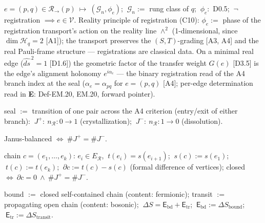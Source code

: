 \begin{definition}[{\texorpdfstring{D1.1}{D1.1}}]\label{tag:D1-1}
$e=(p,q)\in\mathcal R_{\rightarrow}(p)\ \longmapsto\ (\mathcal G_n,\phi_e)$; $\ \mathcal G_n:=$ rung class of $q$; $\ \phi_e:$ D0.5; $\ \neg$registration $\implies e\in\mathcal V$. Reality principle of registration (C10): $\phi_e:=$ phase of the registration transport's action on the reality line $\wedge^2$ (1-dimensional, since $\dim\mathcal H_q=2$ [A1]); the transport preserves the $(S,T)$-grading [A3, A4] and the real Pauli-frame structure — registrations are classical data. On a minimal real edge ($\widehat{ds}^{\,2}=1$ [D1.6]) the geometric factor of the transfer weight $G(e)$ [D3.5] is the edge's alignment holonomy $e^{i\alpha_e}$ — the binary registration read of the A4 branch index at the seal ($\alpha_e=\alpha_{pq}$ for $e=(p,q)$ [A4]; per-edge determination read in \textbf{E}: Def-EM.20, EM.20, forward pointer).

\end{definition}

\begin{definition}[{\texorpdfstring{D1.2}{D1.2}}]\label{tag:D1-2}
seal $:=$ transition of one pair across the A4 criterion (entry/exit of either branch): $\ J^+:\ n_{\mathcal R}:0\to1$ (crystallization); $\ J^-:\ n_{\mathcal R}:1\to0$ (dissolution).

\end{definition}

\begin{definition}[{\texorpdfstring{D1.3}{D1.3}}]\label{tag:D1-3}
Janus-balanced $\iff\ \#J^+=\#J^-$.

\end{definition}

\begin{definition}[{\texorpdfstring{D1.4}{D1.4}}]\label{tag:D1-4}
chain $c=(e_1,\dots,e_k)$: $e_i\in E_{\mathcal R}$, $\ t(e_i)=s(e_{i+1})$; $\ s(c):=s(e_1)$; $\ t(c):=t(e_k)$; $\ \partial c:=t(c)-s(c)$ (formal difference of vertices); closed $\iff\ \partial c=0\ \wedge\ \#J^+=\#J^-$.

\end{definition}

\begin{definition}[{\texorpdfstring{D1.5}{D1.5}}]\label{tag:D1-5}
bound $:=$ closed self-contained chain (content: fermionic); transit $:=$ propagating open chain (content: bosonic); $\ \Delta S=\mathsf E_{\mathrm{bd}}+\mathsf E_{\mathrm{tr}}$; $\ \mathsf E_{\mathrm{bd}}:=\Delta S_{\mathrm{bound}}$; $\ \mathsf E_{\mathrm{tr}}:=\Delta S_{\mathrm{transit}}$.

\end{definition}


